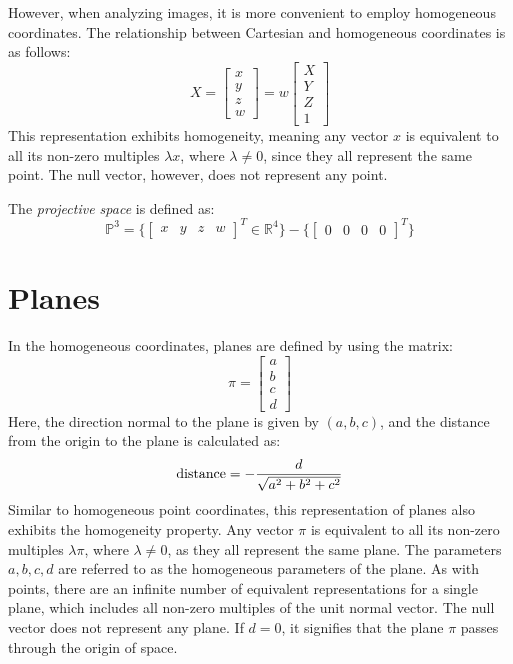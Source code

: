 \documentclass[12pt, a4paper]{report}
\begin{document}
    However, when analyzing images, it is more convenient to employ homogeneous coordinates. 
    The relationship between Cartesian and homogeneous coordinates is as follows:    \[
    X =
    \begin{bmatrix}
        x \\
        y \\
        z \\
        w
    \end{bmatrix}
    =w
    \begin{bmatrix}
        X \\
        Y \\
        Z \\
        1 
    \end{bmatrix}
    \]
    This representation exhibits homogeneity, meaning any vector $x$ is equivalent to all its non-zero multiples $\lambda x$, where $\lambda \neq 0$, since they all represent the same point.
    The null vector, however, does not represent any point.
    \begin{definition}
        The \emph{projective space} is defined as:
        \[\mathbb{P}^3=\{{\begin{bmatrix} x & y & z & w \end{bmatrix}}^T \in \mathbb{R}^4\}-\{{\begin{bmatrix} 0 & 0 & 0 & 0 \end{bmatrix}}^T\}\]
    \end{definition}

    \section{Planes}
    In the homogeneous coordinates, planes are defined by using the matrix: 
    \[\pi=\begin{bmatrix} a \\ b \\c \\d \end{bmatrix}\]
    Here, the direction normal to the plane is given by $(a, b, c)$, and the distance from the origin to the plane is calculated as:
    \[\textnormal{distance}=-\dfrac{d}{\sqrt{a^2+b^2+c^2}}\]
    Similar to homogeneous point coordinates, this representation of planes also exhibits the homogeneity property.
    Any vector $\pi$ is equivalent to all its non-zero multiples $\lambda \pi$, where $\lambda \neq 0$, as they all represent the same plane.
    The parameters $a, b, c, d$ are referred to as the homogeneous parameters of the plane.
    As with points, there are an infinite number of equivalent representations for a single plane, which includes all non-zero multiples of the unit normal vector.
    The null vector does not represent any plane. 
    If $d=0$, it signifies that the plane $\pi$ passes through the origin of space.
\end{document}
